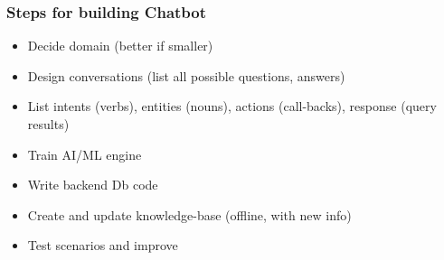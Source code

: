 \begin{frame}\frametitle{Steps for building Chatbot }
\begin{itemize}
\item Decide domain (better if smaller)
\item Design conversations (list all possible questions, answers)
\item List intents (verbs), entities (nouns), actions (call-backs), response (query results)
\item Train AI/ML engine 
\item Write backend Db code
\item Create and update knowledge-base (offline, with new info)
\item Test scenarios and improve
\end{itemize}
\end{frame}




	
